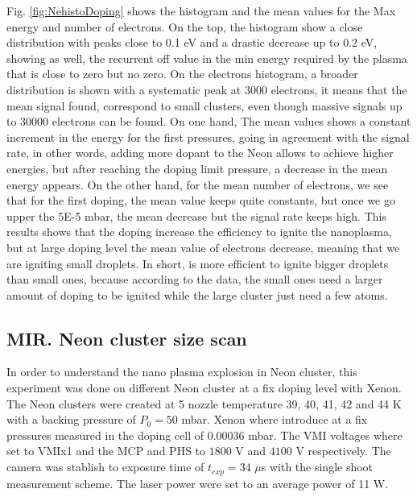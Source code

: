 Fig. \ref{fig:NehistoDoping} shows the histogram and the mean values for the Max energy and number of electrons. On the top, the histogram show a close distribution with peaks close to 0.1 eV and a drastic decrease up to 0.2 eV, showing as well, the recurrent off value in the min energy required by the plasma that is close to zero but no zero. On the electrons histogram, a broader distribution is shown with a systematic peak at 3000 electrons, it means that the mean signal found, correspond to small clusters, even though  massive signals up to 30000 electrons can be found. On one hand, The mean values shows a constant increment in the energy for the first pressures, going in agreement with the signal rate, in other words, adding more dopant to the  Neon allows to achieve higher energies, but after reaching the doping limit pressure, a decrease in the mean energy appears. On the other hand, for the mean number of electrons, we see that for the first doping, the mean value keeps quite constants, but once we go upper the 5E-5 mbar, the mean decrease but the signal rate keeps high. This results shows that the doping increase the efficiency to ignite the nanoplasma, but at large doping level the mean value of electrons decrease, meaning that we are igniting small droplets. In short, is more efficient to ignite bigger droplets than small ones, because according to the data, the small ones need a larger amount of doping to be ignited while the large cluster just need a few atoms.

\subsection{MIR. Neon cluster size scan}

In order to understand the nano plasma explosion in Neon cluster, this experiment was done on different Neon cluster at a fix doping level with Xenon. The Neon clusters were created at 5 nozzle temperature 39, 40, 41, 42 and 44 K with a backing pressure of $P_{0}=50$ mbar. Xenon where introduce at a fix  pressures measured in the doping cell of 0.00036 mbar. The VMI voltages  where set to VMIx1  and the MCP and PHS to $1800$ V and $4100$ V respectively. The camera was stablish to exposure time of $t_{exp}=34$ $\mu$s   with the single shoot measurement scheme. The laser power were set to an average power of 11 W.

